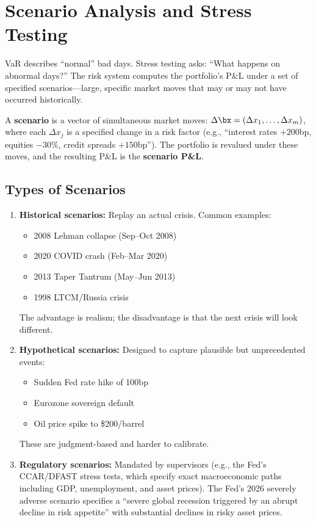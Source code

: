 \section{Scenario Analysis and Stress Testing}
\label{sec:scenarios}

VaR describes ``normal'' bad days.  Stress testing asks: ``What happens
on abnormal days?''  The risk system computes the portfolio's P\&L under
a set of specified scenarios---large, specific market moves that may or
may not have occurred historically.

\begin{prereq}
A \textbf{scenario} is a vector of simultaneous market moves:
$\Delta \bx = (\Delta x_1, \ldots, \Delta x_m)$, where each $\Delta x_j$
is a specified change in a risk factor (e.g., ``interest rates $+200$bp,
equities $-30\%$, credit spreads $+150$bp'').  The portfolio is revalued
under these moves, and the resulting P\&L is the \textbf{scenario P\&L}.
\end{prereq}

\subsection{Types of Scenarios}

\begin{enumerate}[nosep]
  \item \textbf{Historical scenarios:} Replay an actual crisis.  Common
        examples:
  \begin{itemize}[nosep]
    \item 2008 Lehman collapse (Sep--Oct 2008)
    \item 2020 COVID crash (Feb--Mar 2020)
    \item 2013 Taper Tantrum (May--Jun 2013)
    \item 1998 LTCM/Russia crisis
  \end{itemize}
  The advantage is realism; the disadvantage is that the next crisis will
  look different.

  \item \textbf{Hypothetical scenarios:} Designed to capture plausible
        but unprecedented events:
  \begin{itemize}[nosep]
    \item Sudden Fed rate hike of 100bp
    \item Eurozone sovereign default
    \item Oil price spike to \$200/barrel
  \end{itemize}
  These are judgment-based and harder to calibrate.

  \item \textbf{Regulatory scenarios:} Mandated by supervisors (e.g.,
        the Fed's CCAR/DFAST stress tests, which specify exact
        macroeconomic paths including GDP, unemployment, and asset
        prices).  The Fed's 2026 severely adverse scenario specifies a
        ``severe global recession triggered by an abrupt decline in risk
        appetite'' with substantial declines in risky asset prices.
\end{enumerate}

